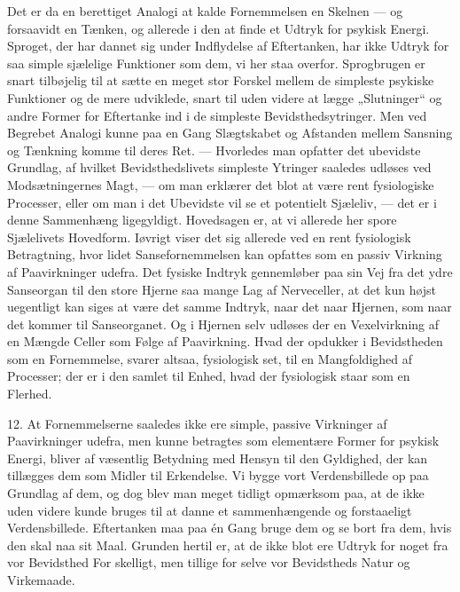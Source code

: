 \documentclass[12pt,a4paper]{book}
\newcommand{\opage}[1]{\marginnote{\footnotesize\textit{[#1]}}}
\newcommand{\apage}[1]{\marginnote{\footnotesize\textit{[#1]}}}
\begin{document}
Det er da en berettiget Analogi at kalde Fornemmelsen en Skelnen ---
og forsaavidt en Tænken, og allerede i den at finde et Udtryk for
psykisk Energi. Sproget, der har dannet sig under Indflydelse af
Eftertanken, har ikke Udtryk for saa simple sjælelige Funktioner som
dem, vi her \apage{39} staa overfor. Sprogbrugen er snart tilbøjelig til at sætte
en meget stor Forskel mellem de simpleste psykiske Funktioner og de
mere udviklede, snart til uden videre at lægge „Slutninger“ og andre
Former for Eftertanke ind i de simpleste Bevidsthedsytringer. Men ved
Begrebet Analogi kunne paa en Gang Slægtskabet og Afstanden mellem
Sansning og Tænkning komme til deres Ret. --- Hvorledes man opfatter
det ubevidste Grundlag, af hvilket Bevidsthedslivets simpleste Ytringer
saaledes udløses ved Modsætningernes Magt, --- om man erklærer det blot
at være rent fysiologiske Processer, eller om man i det Ubevidste vil se
et potentielt Sjæleliv, --- det er i denne Sammenhæng ligegyldigt.
Hovedsagen er, at vi allerede her spore Sjælelivets Hovedform. Iøvrigt
viser det sig allerede ved en rent fysiologisk Betragtning, hvor lidet
Sansefornemmelsen kan opfattes som en passiv Virkning af Paavirkninger
udefra. Det fysiske Indtryk gennemløber paa sin Vej fra det ydre
Sanseorgan til den store Hjerne saa mange Lag af Nerveceller, at det
kun højst uegentligt kan siges at være det samme Indtryk, naar det naar
Hjernen, som naar det kommer til Sanseorganet. Og i Hjernen selv
udløses der en Vexelvirkning af en Mængde Celler som Følge af
Paavirkning. Hvad der opdukker i Bevidstheden som en Fornemmelse,
svarer altsaa, fysiologisk set, til en Mangfoldighed af Processer; der
er i den samlet til Enhed, hvad der fysiologisk staar som en Flerhed.

12. At Fornemmelserne saaledes ikke ere simple, passive Virkninger af
Paavirkninger udefra, men kunne betragtes som elementære Former for
psykisk Energi, bliver af væsentlig Betydning med Hensyn til den
Gyldighed, der kan tillægges dem som Midler til Erkendelse. Vi bygge
vort Verdensbillede op paa Grundlag af dem, og dog blev man meget
tidligt opmærksom paa, at de ikke uden videre kunde bruges til at danne
et sammenhængende og forstaaeligt Verdensbillede. Eftertanken maa paa
én Gang bruge dem og se bort fra dem, hvis den skal naa sit Maal.
Grunden hertil er, at de ikke blot ere Udtryk for noget fra vor
Bevidsthed For%
\opage{40}skelligt, men tillige for selve vor Bevidstheds Natur og
Virkemaade.
\end{document}
